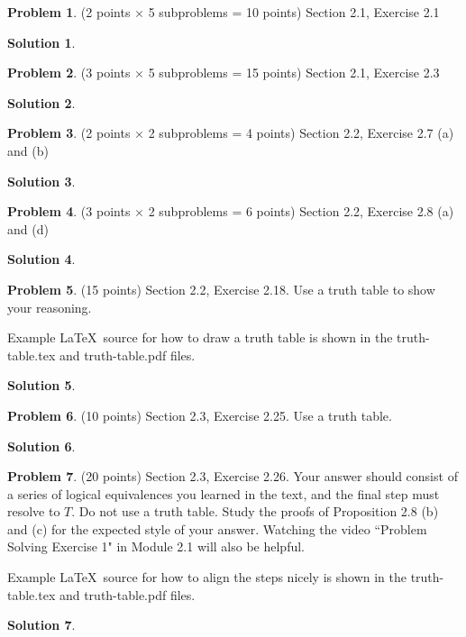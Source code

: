 \documentclass{article}
\theoremstyle{definition}
\newtheorem{problem}{Problem}
\newtheorem*{solution}{Solution}
\begin{document}
\newpage
\begin{problem} (2 points $\times$ 5 subproblems = 10 points) Section 2.1, Exercise 2.1
\end{problem}
\begin{solution}
\end{solution}

\newpage
\begin{problem} (3 points $\times$ 5 subproblems = 15 points) Section 2.1, Exercise 2.3
\end{problem}
\begin{solution}
\end{solution}

\newpage
\begin{problem} (2 points $\times$ 2 subproblems = 4 points) Section 2.2, Exercise 2.7 (a) and (b)
\end{problem}
\begin{solution}
\end{solution}

\newpage
\begin{problem} (3 points $\times$ 2 subproblems = 6 points) Section 2.2, Exercise 2.8 (a) and (d)
\end{problem}
\begin{solution}
\end{solution}

\newpage
\begin{problem} (15 points) Section 2.2, Exercise 2.18.
Use a truth table to show your reasoning. 

Example \LaTeX\ source for how to draw a truth table is shown 
in the truth-table.tex and truth-table.pdf files.
\end{problem}
\begin{solution}
\end{solution}

\newpage
\begin{problem} (10 points) Section 2.3, Exercise 2.25.
Use a truth table.
\end{problem}
\begin{solution} 
\end{solution}

\newpage
\begin{problem} (20 points) Section 2.3, Exercise 2.26.
Your answer should consist of a series of logical equivalences 
you learned in the text, and the final step must resolve to $T$.
Do not use a truth table.  Study the proofs of Proposition 2.8 (b) and (c) 
for the expected style of your answer.  Watching the video ``Problem 
Solving Exercise 1" in Module {2.1} will also be helpful.

Example \LaTeX\ source for how to align the steps nicely is shown 
in the truth-table.tex and truth-table.pdf files.
\end{problem}
\begin{solution} 
\end{solution}
\end{document}

